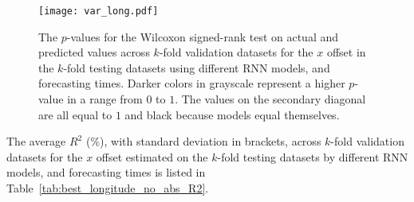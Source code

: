 \begin{figure}[!ht]
	\centering
	\texttt{[image: var\_long.pdf]}
	\caption{The $p$-values for the Wilcoxon signed-rank test on actual and predicted values across $k$-fold validation datasets for the $x$ offset in the $k$-fold testing datasets using different RNN models, and forecasting times. Darker colors in grayscale represent a higher $p$-value in a range from $0$ to $1$. The values on the secondary diagonal are all equal to $1$ and black because models equal themselves.}
	\label{fig:var_long}
\end{figure}

The average $R^{2}$ (\%), with standard deviation in brackets, across $k$-fold validation datasets for the $x$ offset estimated on the $k$-fold testing datasets by different RNN models, and forecasting times is listed in Table~\ref{tab:best_longitude_no_abs_R2}.

\begin{table}[!ht]
	\centering
	\caption{The average $R^{2}$ (\%), with standard deviation in brackets, across $k$-fold validation datasets for the $x$ offset estimated on the $k$-fold testing datasets by different RNN models, and forecasting times.}
	\label{tab:best_longitude_no_abs_R2}
\end{table}

